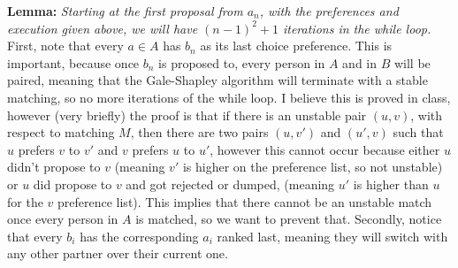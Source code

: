 \documentclass{article}
\begin{document}
\textbf{Lemma:} \textit{Starting at the first proposal from $a_n$, with the preferences and execution given above, we will have $(n-1)^2 +1$ iterations in the while loop.} \newline 
First, note that every $a \in A$ has $b_n$ as its last choice preference. This is important, because once $b_n$ is proposed to, every person in $A$ and in $B$ will be paired, meaning that the Gale-Shapley algorithm will terminate with a stable matching, so no more iterations of the while loop. I believe this is proved in class, however (very briefly) the proof is that if there is an unstable pair $(u,v)$, with respect to matching $M$, then there are two pairs $(u,v')$ and $(u',v)$ such that $u$ prefers $v$ to $v'$ and $v$ prefers $u$ to $u'$, however this cannot occur because either $u$ didn't propose to $v$ (meaning $v'$ is higher on the preference list, so not unstable) or $u$ did propose to $v$ and got rejected or dumped, (meaning $u'$ is higher than $u$ for the $v$ preference list). This implies that there cannot be an unstable match once every person in $A$ is matched, so we want to prevent that. \newline 
Secondly, notice that every $b_i$ has the corresponding $a_i$ ranked last, meaning they will switch with any other partner over their current one. \newline 
\end{document}
